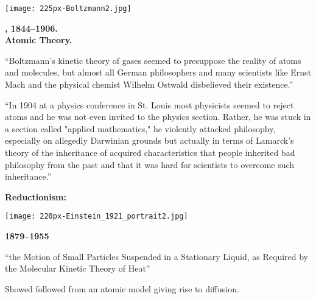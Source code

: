       
    
\begin{marginfigure}[]
\texttt{[image: 225px-Boltzmann2.jpg]}\\
\end{marginfigure}

    
    \textbf{
        , 1844--1906.\\
        Atomic Theory.
      }
      
      
        \small
        ``Boltzmann's kinetic theory of gases seemed to presuppose the
        reality of atoms and molecules, but almost all German philosophers and
        many scientists like Ernst Mach and the physical chemist Wilhelm
        Ostwald disbelieved their existence.''
      
    
  
  
    
     
      \small
      ``In 1904 at a physics conference in St. Louis most
      physicists seemed to reject atoms and he was not even invited
      to the physics section. Rather, he was stuck in a section
      called "applied mathematics," he violently attacked
      philosophy, especially on allegedly Darwinian grounds but
      actually in terms of Lamarck's theory of the inheritance of
      acquired characteristics that people inherited bad philosophy
      from the past and that it was hard for scientists to overcome
      such inheritance.''
    
  


  \textbf{Reductionism:}

      
    
\begin{marginfigure}[]
\texttt{[image: 220px-Einstein\_1921\_portrait2.jpg]}\\
\end{marginfigure}

    
    \textbf{
    1879--1955}
    
     
       ``the Motion of Small Particles Suspended in a Stationary Liquid, as Required by the Molecular Kinetic Theory of Heat''\cite{einstein1905a,einstein1956a}
     
      Showed  
      followed from an atomic model giving rise to diffusion.
    
